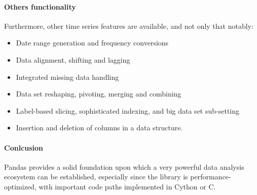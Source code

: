 \paragraph{Others functionality}
Furthermore, other time series features are available, and not only that notably:
\begin{itemize}
    \item Date range generation and frequency conversions
    \item Data alignment, shifting and lagging
    \item Integrated missing data handling
    \item Data set reshaping, pivoting, merging and combining
    \item Label-based slicing, sophisticated indexing, and big data set sub-setting
    \item Insertion and deletion of columns in a data structure.
\end{itemize}
\paragraph{Conlcusion}
Pandas provides a solid foundation upon which a very powerful data analysis ecosystem can be established, especially since the library is performance-optimized, with important code paths implemented in Cython or C. 